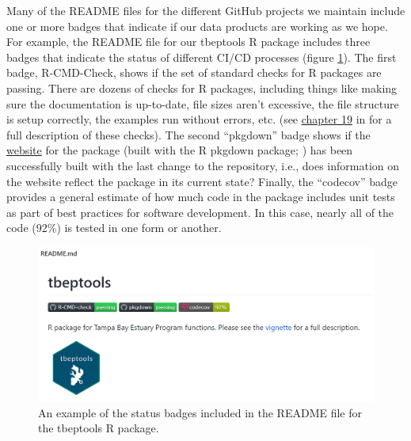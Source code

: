\documentclass[
]{book}
\begin{document}
Many of the README files for the different GitHub projects we maintain include one or more badges that indicate if our data products are working as we hope. For example, the README file for our tbeptools R package includes three badges that indicate the status of different CI/CD processes (figure \ref{fig:badges}). The first badge, R-CMD-Check, shows if the set of standard checks for R packages are passing. There are dozens of checks for R packages, including things like making sure the documentation is up-to-date, file sizes aren't excessive, the file structure is setup correctly, the examples run without errors, etc. (see \href{https://r-pkgs.org/r-cmd-check.html}{chapter 19} in \citet{Wickham15} for a full description of these checks). The second ``pkgdown'' badge shows if the \href{https://tbep-tech.github.io/tbeptools/}{website} for the package (built with the R pkgdown package; \citet{Wickham20}) has been successfully built with the last change to the repository, i.e., does information on the website reflect the package in its current state? Finally, the ``codecov'' badge provides a general estimate of how much code in the package includes unit tests as part of best practices for software development. In this case, nearly all of the code (92\%) is tested in one form or another.

\begin{figure}

{\centering \includegraphics[width=1\linewidth]{img/badges} 

}

\caption{An example of the status badges included in the README file for the tbeptools R package.}\label{fig:badges}
\end{figure}
\end{document}
